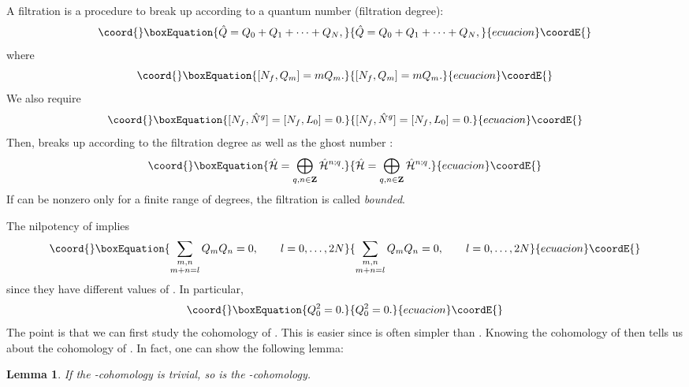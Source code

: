 \documentclass[a4paper,12pt]{article}
\providecommand{\hN}{\hat{N}^g}
\providecommand{\hQ}{\hat{Q}}
\newtheorem{lemma}{Lemma}[section]
\begin{document}
A filtration is a procedure to break up \myHighlight{$\hQ$}\coordHE{} according to a quantum number
\coordHE{} (filtration degree):
\begin{equation}\coord{}\boxEquation{
\hQ = Q_{0}+Q_{1}+\cdots+Q_{N},
}{
\hQ = Q_{0}+Q_{1}+\cdots+Q_{N},
}{ecuacion}\coordE{}\end{equation}
where
\begin{equation}\coord{}\boxEquation{
[N_{f}, Q_{m}] = m Q_{m}.
}{
[N_{f}, Q_{m}] = m Q_{m}.
}{ecuacion}\coordE{}\end{equation}
We also require
\begin{equation}\coord{}\boxEquation{
[N_{f}, \hN] = [N_{f}, L_{0}] = 0.
\label{eq:cond}
}{
[N_{f}, \hN] = [N_{f}, L_{0}] = 0.
}{ecuacion}\coordE{}\end{equation}
Then, \coordHE{} breaks up according to the filtration degree \coordHE{} as well as the ghost number \myHighlight{$\hN (=n)$}\coordHE{}:
\begin{equation}\coord{}\boxEquation{
\hat{\cal H} = \bigoplus_{q,n\in {\bf Z}}\hat{\cal H}^{n;q} .
}{
\hat{\cal H} = \bigoplus_{q,n\in {\bf Z}}\hat{\cal H}^{n;q} .
}{ecuacion}\coordE{}\end{equation}
If \coordHE{} can be nonzero only for a finite range of degrees, the
filtration is called {\it bounded}.

The nilpotency of \myHighlight{$ \hQ^2 $}\coordHE{} implies
\begin{equation}\coord{}\boxEquation{
\sum_{\stackrel{\scriptstyle m, n}{m+n=l}}
Q_{m}Q_{n} = 0,  \qquad l=0, \ldots ,2N
}{
\sum_{\stackrel{\scriptstyle m, n}{m+n=l}}
Q_{m}Q_{n} = 0,  \qquad l=0, \ldots ,2N
}{ecuacion}\coordE{}\end{equation}
since they have different values of \coordHE{}. In particular,
\begin{equation}\coord{}\boxEquation{
Q_{0}^2 = 0.
}{
Q_{0}^2 = 0.
}{ecuacion}\coordE{}\end{equation}
The point is that we can first study the cohomology of
\coordHE{}.
This is easier since \coordHE{} is often simpler than \myHighlight{$ \hQ$}\coordHE{}.
Knowing the cohomology of \coordHE{} then tells us about the cohomology of \myHighlight{$
\hQ $}\coordHE{}. In fact, one can show the following lemma:
\begin{lemma}
%
If the \coordHE{}-cohomology is trivial,  so is the \myHighlight{$ \hQ
$}\coordHE{}-cohomology.
\label{lemma:exact_sequence}
%
\end{lemma}
\end{document}
